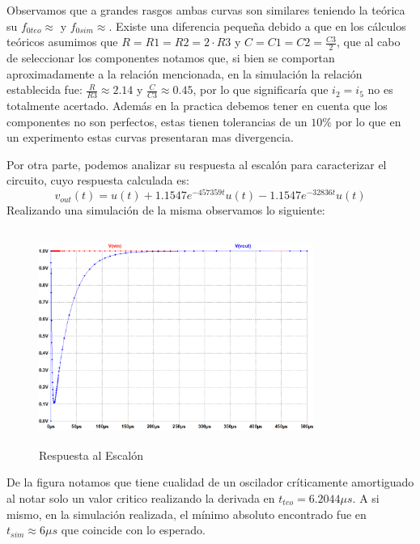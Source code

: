 
Observamos que a grandes rasgos ambas curvas son similares teniendo la teórica su $f_{0teo} \approx $ y $f_{0sim} \approx $. Existe una diferencia pequeña debido a que en los cálculos teóricos asumimos que $R = R1 = R2 = 2 \cdot R3$ y $C = C1 = C2 = \frac{C3}{2}$, que al cabo de seleccionar los componentes notamos que, si bien se comportan aproximadamente a la relación mencionada, en la simulación la relación establecida fue: $\frac{R}{R3} \approx 2.14$ y $\frac{C}{C3} \approx 0.45$, por lo que significaría que $i_2 = i_5$ no es totalmente acertado. Además en la practica debemos tener en cuenta que los componentes no son perfectos, estas tienen tolerancias de un $10\%$ por lo que en un experimento estas curvas presentaran mas divergencia.

Por otra parte, podemos analizar su respuesta al escalón para caracterizar el circuito, cuyo respuesta calculada es: $$v_{out}(t) = u(t) + 1.1547e^{-457359t}u(t) - 1.1547e^{-32836t}u(t)$$
Realizando una simulación de la misma observamos lo siguiente:

\begin{figure}[h]
	\centering
	\includegraphics[width=0.8\textwidth, height = 7cm]{../EJ1/RElaqueva.png}
	\caption{Respuesta al Escalón}
	\label{ej1_3}
\end{figure}

De la figura notamos que tiene cualidad de un oscilador críticamente amortiguado al notar solo un valor critico realizando la derivada en $t_{teo} = 6.2044\mu s$. A si mismo, en la simulación realizada, el mínimo absoluto encontrado fue en $t_{sim} \approx 6 \mu s$ que coincide con lo esperado. 

